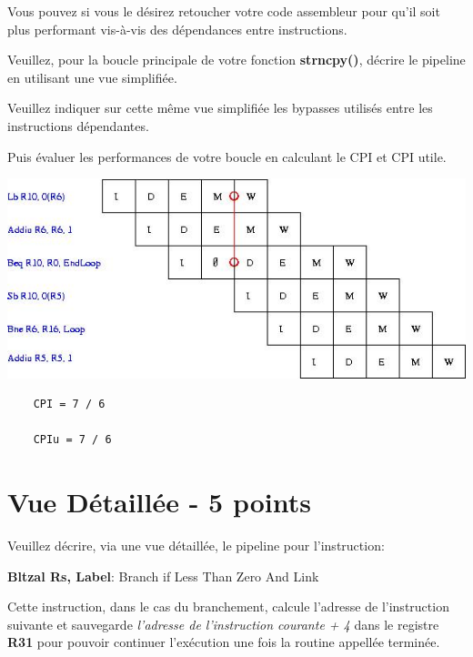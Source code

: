 Vous pouvez si vous le d\'esirez retoucher votre code assembleur
pour qu'il soit plus performant vis-\`a-vis des d\'ependances entre
instructions.

Veuillez, pour la boucle principale de votre fonction \textbf{strncpy()},
d\'ecrire le pipeline en utilisant une vue simplifi\'ee.

Veuillez indiquer sur cette m\^eme vue simplifi\'ee les bypasses utilis\'es
entre les instructions d\'ependantes.

Puis \'evaluer les performances de votre boucle en calculant le CPI et CPI
utile.

\begin{correction}

  \begin{center}
    \includegraphics[scale=0.7]{figures/correction-vue-simplifiee.jpg}
  \end{center}

  \begin{verbatim}
    CPI = 7 / 6

    CPIu = 7 / 6
  \end{verbatim}

\end{correction}

%
%

\section{Vue D\'etaill\'ee - 5 points}

Veuillez d\'ecrire, via une vue d\'etaill\'ee, le pipeline pour l'instruction:

\textbf{Bltzal Rs, Label}: Branch if Less Than Zero And Link

Cette instruction, dans le cas du branchement, calcule l'adresse de
l'instruction suivante et sauvegarde \textit{l'adresse de l'instruction
courante + 4} dans le registre \textbf{R31} pour pouvoir continuer
l'ex\'ecution une fois la routine appell\'ee termin\'ee.

